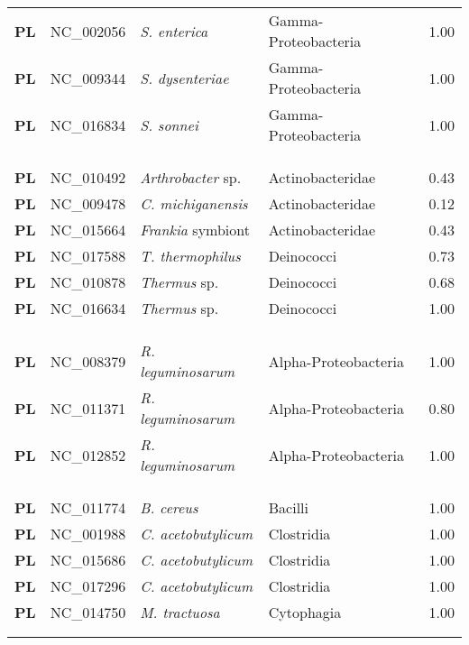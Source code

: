 \begin{adjustwidth}{-3cm}{2cm}
{\begin{supertabular}{>{\bfseries}l|p{0.1\textwidth}p{0.14\textwidth}l|l}
PL & NC\_002056 & \textit{S. enterica} & Gamma-Proteobacteria & 1.00\\
PL & NC\_009344 & \textit{S. dysenteriae} & Gamma-Proteobacteria & 1.00\\
PL & NC\_016834 & \textit{S. sonnei} & Gamma-Proteobacteria & 1.00\\
\\
\\
\hline\\
PL & NC\_010492 & \textit{Arthrobacter} sp. & Actinobacteridae & 0.43\\
PL & NC\_009478 & \textit{C. michiganensis} & Actinobacteridae & 0.12\\
PL & NC\_015664 & \textit{Frankia} symbiont & Actinobacteridae & 0.43\\
PL & NC\_017588 & \textit{T. thermophilus} & Deinococci & 0.73\\
PL & NC\_010878 & \textit{Thermus} sp. & Deinococci & 0.68\\
PL & NC\_016634 & \textit{Thermus} sp. & Deinococci & 1.00\\
\\
\\
\hline\\
PL & NC\_008379 & \textit{R. leguminosarum} & Alpha-Proteobacteria & 1.00\\
PL & NC\_011371 & \textit{R. leguminosarum} & Alpha-Proteobacteria & 0.80\\
PL & NC\_012852 & \textit{R. leguminosarum} & Alpha-Proteobacteria & 1.00\\
\\
\\
\hline\\
PL & NC\_011774 & \textit{B. cereus} & Bacilli & 1.00\\
PL & NC\_001988 & \textit{C. acetobutylicum} & Clostridia & 1.00\\
PL & NC\_015686 & \textit{C. acetobutylicum} & Clostridia & 1.00\\
PL & NC\_017296 & \textit{C. acetobutylicum} & Clostridia & 1.00\\
PL & NC\_014750 & \textit{M. tractuosa} & Cytophagia & 1.00\\
\\
\\

\end{supertabular}}
\end{adjustwidth}
